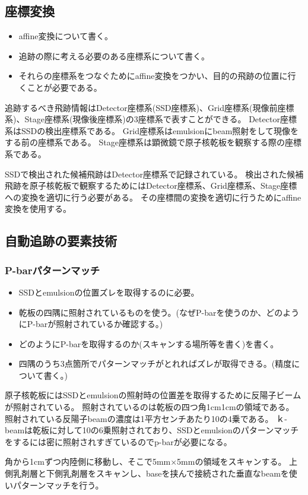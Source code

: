 \documentclass[12pt,a4paper]{jarticle}
\begin{document}
\subsection{座標変換}
\begin{itemize}
    \item affine変換について書く。
    \item 追跡の際に考える必要のある座標系について書く。
    \item それらの座標系をつなぐためにaffine変換をつかい、目的の飛跡の位置に行くことが必要である。
\end{itemize}
追跡するべき飛跡情報はDetector座標系(SSD座標系)、Grid座標系(現像前座標系)、Stage座標系(現像後座標系)の3座標系で表すことができる。
Detector座標系はSSDの検出座標系である。
Grid座標系はemulsionにbeam照射をして現像をする前の座標系である。
Stage座標系は顕微鏡で原子核乾板を観察する際の座標系である。
\par
SSDで検出された候補飛跡はDetector座標系で記録されている。
検出された候補飛跡を原子核乾板で観察するためにはDetector座標系、Grid座標系、Stage座標への変換を適切に行う必要がある。
その座標間の変換を適切に行うためにaffine変換を使用する。
\par
\subsection{自動追跡の要素技術}
\subsubsection{P-barパターンマッチ}
\begin{itemize}
    \item SSDとemulsionの位置ズレを取得するのに必要。
    \item 乾板の四隅に照射されているものを使う。(なぜP-barを使うのか、どのようにP-barが照射されているか確認する。)
    \item どのようにP-barを取得するのか(スキャンする場所等を書く)を書く。
    \item 四隅のうち3点箇所でパターンマッチがとれればズレが取得できる。(精度について書く。)
\end{itemize}
原子核乾板にはSSDとemulsionの照射時の位置差を取得するために反陽子ビームが照射されている。
照射されているのは乾板の四つ角1cm1cmの領域である。
照射されている反陽子beamの濃度は1平方センチあたり10の4乗である。
ｋ-beamは乾板に対して10の6乗照射されており、SSDとemulsionのパターンマッチをするには密に照射されすぎているのでp-barが必要になる。
\par
角から1cmずつ内陸側に移動し、そこで5mm×5mmの領域をスキャンする。
上側乳剤層と下側乳剤層をスキャンし、baseを挟んで接続された垂直なbeamを使いパターンマッチを行う。
\par
\end{document}
